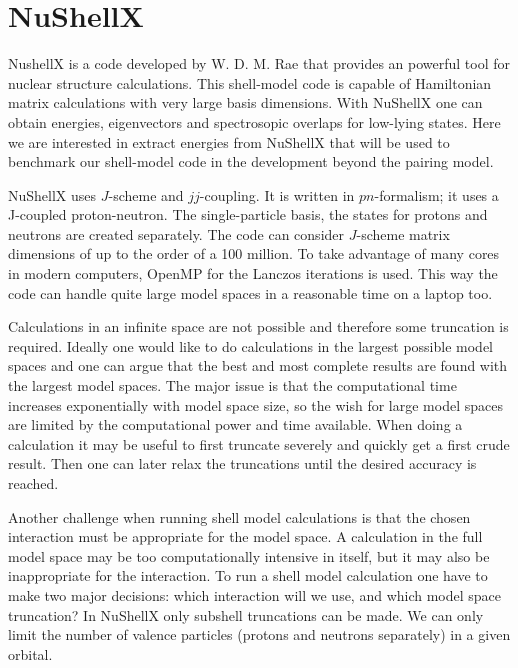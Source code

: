 \documentclass[twoside]{article}
\begin{document}
\section{NuShellX}
\label{sec: NushellX}

NushellX is a code developed by W. D. M. Rae \cite{ref: nushellx} that provides an powerful tool for nuclear structure calculations. This shell-model code is capable of Hamiltonian matrix calculations with very large basis dimensions. With NuShellX one can obtain energies, eigenvectors and spectrosopic overlaps for low-lying states. Here we are interested in extract energies from NuShellX that will be used to benchmark our shell-model code in the development beyond the pairing model. 

NuShellX uses $J$-scheme and $jj$-coupling. It is written in $pn$-formalism; it uses a J-coupled proton-neutron. %
The single-particle basis, the states for protons and neutrons are created separately. The code can consider $J$-scheme matrix dimensions of up to the order of a 100 million. To take advantage of many cores in modern computers, OpenMP for the Lanczos iterations is used. This way the code can handle quite large model spaces in a reasonable time on a laptop too.  

Calculations in an infinite space are not possible and therefore some truncation is required. Ideally one would like to do calculations in the largest possible model spaces and one can argue that the best and most complete results are found with the largest model spaces. The major issue is that the computational time increases exponentially with model space size, so the wish for large model spaces are limited by the computational power and time available. When doing a calculation it may be useful to first truncate severely and quickly get a first crude result. Then one can later relax the truncations until the desired accuracy is reached. 

Another challenge when running shell model calculations is that the chosen interaction must be appropriate for the model space. A calculation in the full model space may be too computationally intensive in itself, but it may also be inappropriate for the interaction. To run a shell model calculation one have to make two major decisions: which interaction will we use, and which model space truncation? In NuShellX only subshell truncations can be made. We can only limit the number of valence particles (protons and neutrons separately) in a given orbital. %
\end{document}
